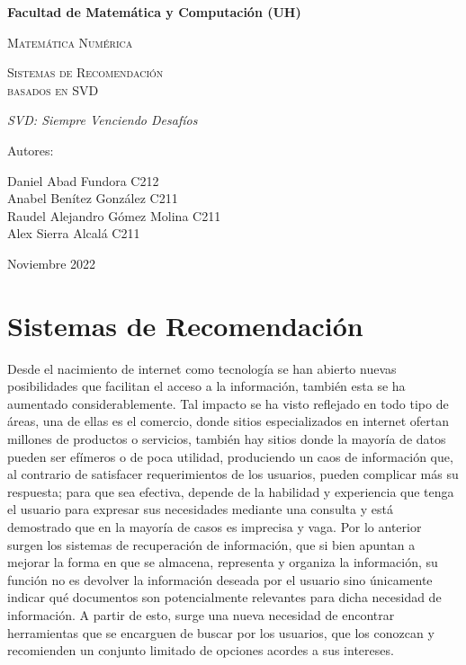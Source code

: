 \documentclass{article}
\begin{document}
\begin{titlepage}
\centering
{\bfseries\LARGE Facultad de Matemática y Computación (UH) \par}
\vspace{1cm}
{\scshape\Large Matemática Numérica \par}
\vspace{3cm}
{\scshape\Huge Sistemas de Recomendación \\basados en SVD \par}
\vspace{3cm}
{\itshape\Large SVD: Siempre Venciendo Desafíos \par}
\vfill
{\Large Autores: \par}
{\Large Daniel Abad Fundora C212\\
		Anabel Benítez González C211\\
		Raudel Alejandro Gómez Molina C211\\
		Alex Sierra Alcalá C211\\ \par}
\vfill
{\Large Noviembre 2022 \par}
\end{titlepage}

\section{Sistemas de Recomendación}

Desde el nacimiento de internet como tecnología se han abierto nuevas posibilidades que facilitan el acceso a la información, también esta se ha aumentado considerablemente. Tal impacto se ha visto reflejado en todo tipo de áreas, una de ellas es el comercio, donde sitios especializados en internet ofertan millones de productos o servicios, también hay sitios donde la 
mayoría de datos pueden ser efímeros o de poca utilidad, produciendo un caos de información que, al contrario de satisfacer requerimientos de los usuarios, pueden complicar más su respuesta; para que sea efectiva, depende de la habilidad y experiencia que tenga el usuario para expresar sus necesidades mediante una consulta y está demostrado que en la mayoría de casos es imprecisa y vaga. Por lo anterior surgen los sistemas de recuperación de información, que si bien apuntan a mejorar la forma en que se almacena, representa y organiza la información, su función no es devolver la información deseada por el usuario sino únicamente indicar qué documentos son potencialmente relevantes para dicha necesidad de información. A partir de esto, surge una nueva necesidad de encontrar herramientas que se encarguen de buscar por los usuarios, que los conozcan y recomienden un conjunto limitado de opciones acordes a sus intereses. 
\end{document}
